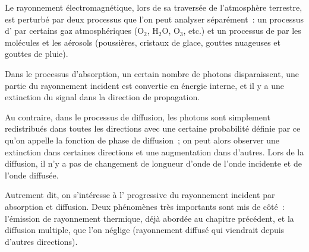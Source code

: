 \sk
Le rayonnement électromagnétique, lors de sa traversée de l'atmosphère terrestre, est perturbé par deux processus que l'on peut analyser séparément~: un processus d' par certains gaz atmosphériques (O$_2$, H$_2$O, O$_3$, etc.) et un processus de  par les molécules et les aérosols (poussières, cristaux de glace, gouttes nuageuses et gouttes de pluie). 
\begin{finger}
\item Dans le processus d'absorption, un certain nombre de photons disparaissent, une partie du rayonnement incident est convertie en énergie interne, et il y a une extinction du signal dans la direction de propagation. 
\item Au contraire, dans le processus de diffusion, les photons sont simplement redistribués dans toutes les directions avec une certaine probabilité définie par ce qu'on appelle la fonction de phase de diffusion~; on peut alors observer une extinction dans certaines directions et une augmentation dans d'autres. Lors de la diffusion, il n'y a pas de changement de longueur d'onde de l'onde incidente et de l'onde diffusée.
\end{finger}
Autrement dit, on s'intéresse à l' progressive du rayonnement incident par absorption et diffusion. Deux phénomènes très importants sont mis de côté~: l'émission de rayonnement thermique, déjà abordée au chapitre précédent, et la diffusion multiple, que l'on néglige (rayonnement diffusé qui viendrait depuis d'autres directions).
